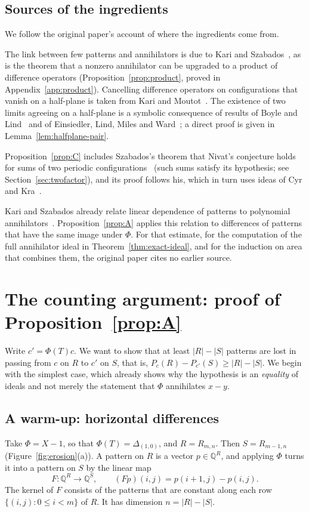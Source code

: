 \documentclass[11pt,a4paper,reqno]{amsart}
\theoremstyle{definition}
\theoremstyle{remark}
\newcommand{\Q}{\mathbb Q}
\newcommand{\De}{\Delta}
\numberwithin{equation}{section}
\begin{document}
\subsection{Sources of the ingredients}
We follow the original paper's account of where the ingredients come from.

The link between few patterns and annihilators is due to Kari and Szabados~\cite{KS}, as is the theorem that a nonzero annihilator can be upgraded to a product of difference operators (Proposition~\ref{prop:product}, proved in Appendix~\ref{app:product}). Cancelling difference operators on configurations that vanish on a half-plane is taken from Kari and Moutot~\cite{KM}. The existence of two limits agreeing on a half-plane is a symbolic consequence of results of Boyle and Lind~\cite{BL} and of Einsiedler, Lind, Miles and Ward~\cite{ELMW}; a direct proof is given in Lemma~\ref{lem:halfplane-pair}.

Proposition~\ref{prop:C} includes Szabados's theorem that Nivat's conjecture holds for sums of two periodic configurations~\cite{Sz} (such sums satisfy its hypothesis; see Section~\ref{sec:twofactor}), and its proof follows his, which in turn uses ideas of Cyr and Kra~\cite{CK}.

Kari and Szabados already relate linear dependence of patterns to polynomial annihilators~\cite[proofs of Lemmas~6 and~32]{KS}. Proposition~\ref{prop:A} applies this relation to differences of patterns that have the same image under $\Phi$. For that estimate, for the computation of the full annihilator ideal in Theorem~\ref{thm:exact-ideal}, and for the induction on area that combines them, the original paper cites no earlier source.

\section{The counting argument: proof of Proposition~\ref{prop:A}}\label{sec:descent}

Write $c'=\Phi(T)c$. We want to show that at least $|R|-|S|$ patterns are lost in passing from $c$ on $R$ to $c'$ on $S$, that is, $P_c(R)-P_{c'}(S)\ge|R|-|S|$. We begin with the simplest case, which already shows why the hypothesis is an \emph{equality} of ideals and not merely the statement that $\Phi$ annihilates $x-y$.

\subsection{A warm-up: horizontal differences}\label{ssec:warmup}
Take $\Phi=X-1$, so that $\Phi(T)=\De_{(1,0)}$, and $R=R_{m,n}$. Then $S=R_{m-1,n}$ (Figure~\ref{fig:erosion}(a)). A pattern on $R$ is a vector $p\in\Q^R$, and applying $\Phi$ turns it into a pattern on $S$ by the linear map
\[
 F\colon\Q^R\to\Q^S,\qquad (Fp)(i,j)=p(i+1,j)-p(i,j).
\]
The kernel of $F$ consists of the patterns that are constant along each row $\{(i,j):0\le i<m\}$ of $R$. It has dimension $n=|R|-|S|$.
\end{document}
